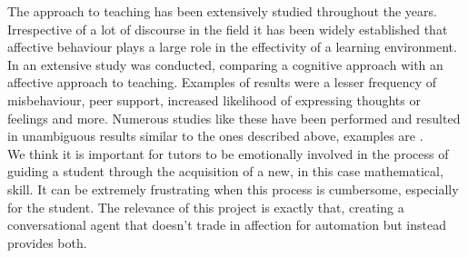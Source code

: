 The approach to teaching has been extensively studied throughout the years. Irrespective of a lot of discourse in the field it has been widely established that affective behaviour plays a large role in the effectivity of a learning environment.\\

\noindent In \cite{shechtman2004affective} an extensive study was conducted, comparing a cognitive approach with an affective approach to teaching. Examples of results were a lesser frequency of misbehaviour, peer support, increased likelihood of expressing thoughts or feelings and more. Numerous studies like these have been performed and resulted in unambiguous results similar to the ones described above, examples are \cite{griffith2006educators} \cite{miller2005teaching} \cite{garritz2010personal}.\\

\noindent We think it is important for tutors to be emotionally involved in the process of guiding a student through the acquisition of a new, in this case mathematical, skill. It can be extremely frustrating when this process is cumbersome, especially for the student. The relevance of this project is exactly that, creating a conversational agent that doesn't trade in affection for automation but instead provides both.\\